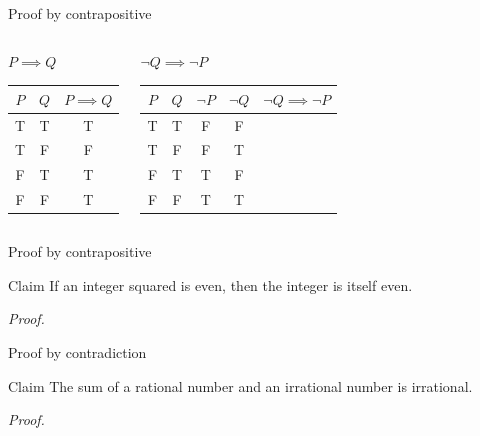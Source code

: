 \documentclass [aspectratio=169]{beamer}
\begin{document}
\begin{frame}{Proof by contrapositive}
    \begin{columns}
        \begin{center}
        $P \implies Q$ \\
        \vspace{1.5em}
\begin{tabular}{|c|c| c|}
\hline
     $P$& $Q$ &  $P \implies Q$ \\ \hline
     T& T & T \\ \hline
     T & F & F \\ \hline
     F & T & T \\ \hline
     F & F & T \\ \hline
\end{tabular}
\end{center}
        \begin{center}
        $\neg Q \implies \neg P$ \\
        \vspace{1.5em}
        \begin{tabular}{|c | c | c |  c | c |}
\hline
     $P$& $Q$ & $\neg P$ &  $\neg Q$ & $\neg Q \implies \neg P$ \\ \hline
     T& T & F & F &  \\ \hline
     T & F & F &  T & \\ \hline
     F & T &  T  & F & \\ \hline
     F & F & T & T &  \\ \hline
\end{tabular}
\end{center}
\end{columns}
\end{frame}


\begin{frame}{Proof by contrapositive}
\begin{exampleblock}{Claim}
If an integer squared is even, then the integer is itself even.
\end{exampleblock}

\textit{Proof.}
\vspace{9em}


\end{frame}


\begin{frame}{Proof by contradiction}
\begin{exampleblock}{Claim}
The sum of a rational number and an irrational number is irrational.
\end{exampleblock}

\textit{Proof.}
\vspace{9em}
\end{frame}
\end{document}
